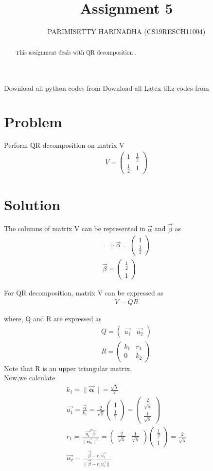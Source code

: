 \documentclass[journal,12pt,twocolumn]{IEEEtran}
\title{Assignment 5}
\author{PARIMISETTY HARINADHA (CS19RESCH11004)}
\newcommand{\myvec}[1]{\ensuremath{\begin{pmatrix}#1\end{pmatrix}}}
\begin{document}
\maketitle
\newpage
\begin{abstract}
This assignment deals with QR decomposition .
\end{abstract}
Download all python codes from 
Download all Latex-tikz codes from 
\section{Problem}
Perform QR decomposition on matrix V
\begin{align}
    V=\myvec{ 1 & \frac{1}{2} \\ \frac{1}{2} & 1 }
\end{align}
\section{Solution}
The columns of matrix V can be represented in $\vec{\alpha}$ and $\vec{\beta}$ as
\begin{align}
    \implies\vec{\alpha}=\myvec{1 \\ \frac{1}{2}}\\
    \vec{\beta}=\myvec{\frac{1}{2}\\ 1}
\end{align}

For QR decomposition, matrix V can be expressed as
\begin{align}
    V=QR \label{eq:4}
\end{align}

where, Q and R are expressed as
\begin{align}
    Q=\myvec{\vec{u_1} & \vec{u_2}} \label{eq:5}\\
    R=\myvec{k_1 & r_1 \\ 0 & k_2} \label{eq:6}
\end{align}
Note that R is an upper triangular matrix.\\

Now,we calculate
\begin{align}
    k_1=\| \mathbf{\vec{\alpha}} \|=\frac{\sqrt{5}}{2}\\
    \vec{u_1}=\frac{\vec{\alpha}}{k_1}=\frac{2}{\sqrt{5}}\myvec{1 \\ \frac{1}{2}}=\myvec{\frac{2}{\sqrt{5}} \\ \frac{1}{\sqrt{5}}}\\
r_1=\frac{\vec{u_1}^T\vec{\beta}}{\| \mathbf{\vec{u_1}} \|^2}=\myvec{\frac{2}{\sqrt{5}} & \frac{1}{\sqrt{5}}}\myvec{\frac{1}{2} \\ 1}=\frac{2}{\sqrt{5}}\\
\vec{u_2}=\frac{\vec{\beta}-r_1\vec{u_1}}{\| \vec{\beta}-r_1\vec{u_1} \|}\label{eq:10}
\end{align}
\end{document}
